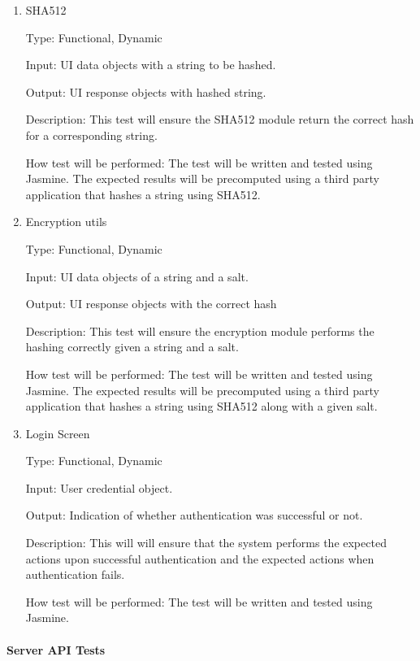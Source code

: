 \documentclass[12pt, titlepage]{article}
\begin{document}
\begin{enumerate}

  \item{SHA512\\}

  Type: Functional, Dynamic

  Input: UI data objects with a string to be hashed.

  Output: UI response objects with hashed string.

  Description: This test will ensure the SHA512 module return the correct
    hash for a corresponding string.

  How test will be performed: The test will be written and tested using
    Jasmine. The expected results will be precomputed using a third party
    application that hashes a string using SHA512.

  \item{Encryption utils\\}

  Type: Functional, Dynamic

  Input: UI data objects of a string and a salt.

  Output: UI response objects with the correct hash

  Description: This test will ensure the encryption module performs the
    hashing correctly given a string and a salt.

  How test will be performed: The test will be written and tested using
    Jasmine. The expected results will be precomputed using a third party
    application that hashes a string using SHA512 along with a given salt.

  \item{Login Screen\\}

  Type: Functional, Dynamic

  Input: User credential object.

  Output: Indication of whether authentication was successful or not.

  Description: This will will ensure that the system performs the expected
    actions upon successful authentication and the expected actions when
    authentication fails.

  How test will be performed: The test will be written and tested using
    Jasmine.

\end{enumerate}

\paragraph{Server API Tests}
\end{document}
